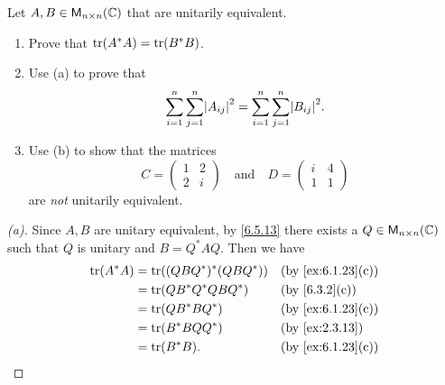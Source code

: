 \begin{ex}\label{ex:6.5.21}
  Let \(A, B \in \ms[n][n][\C]\) that are unitarily equivalent.
  \begin{enumerate}
    \item Prove that \(\tr[A^* A] = \tr[B^* B]\).
    \item Use (a) to prove that
          \[
            \sum_{i = 1}^n \sum_{j = 1}^n \abs{A_{i j}}^2 = \sum_{i = 1}^n \sum_{j = 1}^n \abs{B_{i j}}^2.
          \]
    \item Use (b) to show that the matrices
          \[
            C = \begin{pmatrix}
              1 & 2 \\
              2 & i
            \end{pmatrix} \quad \text{and} \quad D = \begin{pmatrix}
              i & 4 \\
              1 & 1
            \end{pmatrix}
          \]
          are \emph{not} unitarily equivalent.
  \end{enumerate}
\end{ex}

\begin{proof}[(a)]
  Since \(A, B\) are unitary equivalent, by \cref{6.5.13} there exists a \(Q \in \ms[n][n][\C]\) such that \(Q\) is unitary and \(B = Q^* A Q\).
  Then we have
  \begin{align*}
    \tr[A^* A] & = \tr[(Q B Q^*)^* (Q B Q^*)] &  & \by{ex:6.1.23}[c] \\
               & = \tr[Q B^* Q^* Q B Q^*]     &  & \by{6.3.2}[c]     \\
               & = \tr[Q B^* B Q^*]           &  & \by{ex:6.1.23}[c] \\
               & = \tr[B^* B Q Q^*]           &  & \by{ex:2.3.13}    \\
               & = \tr[B^* B].                &  & \by{ex:6.1.23}[c]
  \end{align*}
\end{proof}

